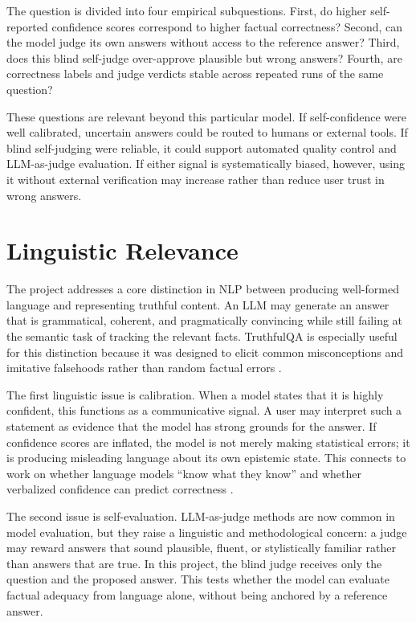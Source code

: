 \documentclass[11pt,a4paper]{article}
\begin{document}
The question is divided into four empirical subquestions. First, do higher self-reported confidence scores correspond to higher factual correctness? Second, can the model judge its own answers without access to the reference answer? Third, does this blind self-judge over-approve plausible but wrong answers? Fourth, are correctness labels and judge verdicts stable across repeated runs of the same question?

These questions are relevant beyond this particular model. If self-confidence were well calibrated, uncertain answers could be routed to humans or external tools. If blind self-judging were reliable, it could support automated quality control and LLM-as-judge evaluation. If either signal is systematically biased, however, using it without external verification may increase rather than reduce user trust in wrong answers.

\section{Linguistic Relevance}

The project addresses a core distinction in NLP between producing well-formed language and representing truthful content. An LLM may generate an answer that is grammatical, coherent, and pragmatically convincing while still failing at the semantic task of tracking the relevant facts. TruthfulQA is especially useful for this distinction because it was designed to elicit common misconceptions and imitative falsehoods rather than random factual errors \cite{lin2022truthfulqa}.

The first linguistic issue is calibration. When a model states that it is highly confident, this functions as a communicative signal. A user may interpret such a statement as evidence that the model has strong grounds for the answer. If confidence scores are inflated, the model is not merely making statistical errors; it is producing misleading language about its own epistemic state. This connects to work on whether language models ``know what they know'' and whether verbalized confidence can predict correctness \cite{kadavath2022language}.

The second issue is self-evaluation. LLM-as-judge methods are now common in model evaluation, but they raise a linguistic and methodological concern: a judge may reward answers that sound plausible, fluent, or stylistically familiar rather than answers that are true. In this project, the blind judge receives only the question and the proposed answer. This tests whether the model can evaluate factual adequacy from language alone, without being anchored by a reference answer.
\end{document}
